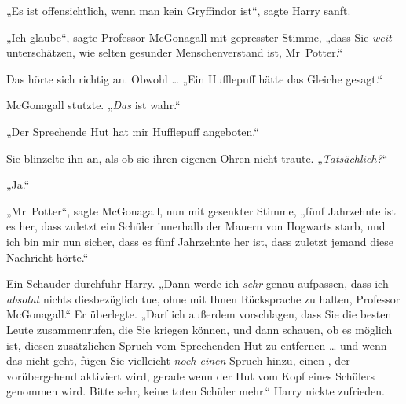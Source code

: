 „Es ist offensichtlich, wenn man kein Gryffindor ist“, sagte Harry sanft.

„Ich glaube“, sagte Professor McGonagall mit gepresster Stimme, „dass Sie \emph{weit} unterschätzen, wie selten gesunder Menschenverstand ist, Mr~Potter.“





Das hörte sich richtig an. Obwohl …
„Ein Hufflepuff hätte das Gleiche gesagt.“

McGonagall stutzte.
„\emph{Das} ist wahr.“

„Der Sprechende Hut hat mir Hufflepuff angeboten.“

Sie blinzelte ihn an, als ob sie ihren eigenen Ohren nicht traute.
„\emph{Tatsächlich?}“

„Ja.“

„Mr~Potter“, sagte McGonagall, nun mit gesenkter Stimme, „fünf Jahrzehnte ist es her, dass zuletzt ein Schüler innerhalb der Mauern von Hogwarts starb, und ich bin mir nun sicher, dass es fünf Jahrzehnte her ist, dass zuletzt jemand diese Nachricht hörte.“

Ein Schauder durchfuhr Harry.
„Dann werde ich \emph{sehr} genau aufpassen, dass ich \emph{absolut} nichts diesbezüglich tue, ohne mit Ihnen Rücksprache zu halten, Professor McGonagall.“ Er überlegte.
„Darf ich außerdem vorschlagen, dass Sie die besten Leute zusammenrufen, die Sie kriegen können, und dann schauen, ob es möglich ist, diesen zusätzlichen Spruch vom Sprechenden Hut zu entfernen … und wenn das nicht geht, fügen Sie vielleicht \emph{noch einen} Spruch hinzu, einen , der vorübergehend aktiviert wird, gerade wenn der Hut vom Kopf eines Schülers genommen wird. Bitte sehr, keine toten Schüler mehr.“ Harry nickte zufrieden.

